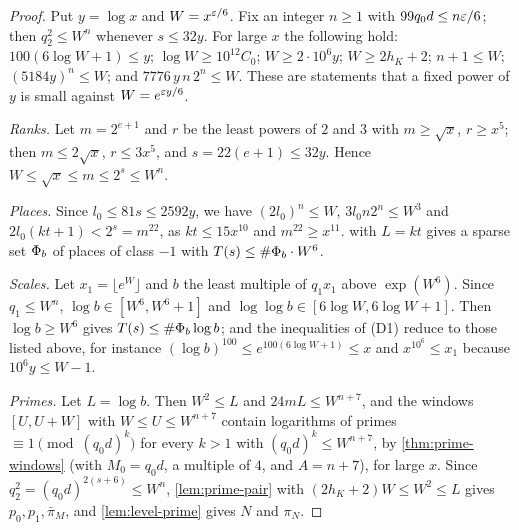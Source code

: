 \begin{proof}
Put $y=\log x$ and $W=x^{\varepsilon/6}$. Fix an integer $n\ge1$ with $99q_0d\le n\varepsilon/6$; then
$q_2^2\le W^n$ whenever $s\le32y$. For large $x$ the following hold: $100(6\log W+1)\le y$;
$\log W\ge10^{12}C_0$; $W\ge2\cdot10^6y$; $W\ge2h_K+2$; $n+1\le W$; $(5184y)^n\le W$; and
$7776\,y\,n\,2^n\le W$. These are statements that a fixed power of $y$ is small against
$W=e^{\varepsilon y/6}$.

\emph{Ranks.} Let $m=2^{e+1}$ and $r$ be the least powers of $2$ and $3$ with $m\ge\sqrt x$, $r\ge x^5$;
then $m\le2\sqrt x$, $r\le3x^5$, and $s=22(e+1)\le32y$. Hence $W\le\sqrt x\le m\le2^s\le W^n$.

\emph{Places.} Since $l_0\le81s\le2592y$, we have $(2l_0)^n\le W$, $3l_0n2^n\le W^3$ and
$2l_0(kt+1)<2^s=m^{22}$, as $kt\le15x^{10}$ and $m^{22}\ge x^{11}$.  with $L=kt$
gives a sparse set $\Phi_b$ of places of class $-1$ with $T(s)\le\#\Phi_b\cdot W^6$.

\emph{Scales.} Let $x_1=\lfloor e^W\rfloor$ and $b$ the least multiple of $q_1x_1$ above
$\exp(W^6)$. Since $q_1\le W^n$, $\log b\in[W^6,W^6+1]$ and $\log\log b\in[6\log W,6\log W+1]$. Then
$\log b\ge W^6$ gives $T(s)\le\#\Phi_b\log b$; and the inequalities of (D1) reduce to those listed
above, for instance $(\log b)^{100}\le e^{100(6\log W+1)}\le x$ and $x^{10^6}\le x_1$ because
$10^6y\le W-1$.

\emph{Primes.} Let $L=\log b$. Then $W^2\le L$ and $24mL\le W^{n+7}$, and the windows
$[U,U+W]$ with $W\le U\le W^{n+7}$ contain logarithms of primes $\equiv1\pmod{(q_0d)^k}$ for every
$k>1$ with $(q_0d)^k\le W^{n+7}$, by \cref{thm:prime-windows} (with $M_0=q_0d$, a multiple of $4$, and
$A=n+7$), for large $x$. Since $q_2^2=(q_0d)^{2(s+6)}\le W^n$, \cref{lem:prime-pair} with
$(2h_K+2)W\le W^2\le L$ gives $p_0,p_1,\bar\pi_M$, and \cref{lem:level-prime} gives $N$ and $\pi_N$.
\end{proof}
